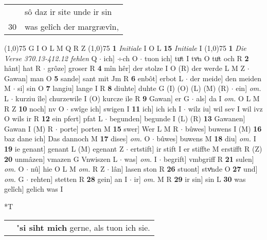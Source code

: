 \documentclass[8pt,a4paper,notitlepage]{article}
\begin{document}
\begin{table}[ht]
\begin{minipage}[t]{0.5\linewidth}
\begin{tabular}{rl}
 & sô daz ir site unde ir sin\\ 
30 & was gelîch der margrævîn,\\ 
\end{tabular}
\scriptsize
\line(1,0){75} \newline
G I O L M Q R Z \newline
\line(1,0){75} \newline
\textbf{1} \textit{Initiale} I O L  \textbf{15} \textit{Initiale} I  \newline
\line(1,0){75} \newline
\textbf{1} \textit{Die Verse 370.13-412.12 fehlen} Q   $\cdot$ ich] ÷ch O  $\cdot$ tuon ich] tuͤt I tvͦn O tuͦt och R \textbf{2} hânt] hat R  $\cdot$ grôze] groser R \textbf{4} mîn hêr] der stolze I O (R) der werde L M Z  $\cdot$ Gawan] man O \textbf{5} sande] sant mit Jm R \textbf{6} enbôt] erbot L  $\cdot$ der meide] den meiden M  $\cdot$ si] sin O \textbf{7} langiu] lange I R \textbf{8} diuhte] duhte G (I) (O) (L) (M) (R)  $\cdot$ ein] \textit{om.} L  $\cdot$ kurziu île] churzewile I (O) kurcze ile R \textbf{9} Gawan] er G  $\cdot$ als] da I \textit{om.} O L M R Z \textbf{10} noch] nv O  $\cdot$ swîge ich] swigen I \textbf{11} ich] ich ich I  $\cdot$ wilz iu] wil sev I wil ivz O wils ir R \textbf{12} ein pfert] pfat L  $\cdot$ begunden] begunde I (L) (R) \textbf{13} Gawanen] Gawan I (M) R  $\cdot$ porte] porten M \textbf{15} swer] Wer L M R  $\cdot$ bûwes] buwens I (M) \textbf{16} baz dane ich] Das dannoch M \textbf{17} dises] \textit{om.} O  $\cdot$ bûwes] buwens M \textbf{18} diu] \textit{om.} I \textbf{19} ie genant] genant L (M) egenant Z  $\cdot$ ertstift] ir stift I er stiffte M erstifft R (Z) \textbf{20} unmâzen] vmazen G Vnwiszen L  $\cdot$ was] \textit{om.} I  $\cdot$ begrift] vmbgriff R \textbf{21} sulen] \textit{om.} O  $\cdot$ nû] hie O L M \textit{om.} R Z  $\cdot$ lân] lasen ston R \textbf{26} stuont] stvͦnde O \textbf{27} und] \textit{om.} G  $\cdot$ rehten] stetten R \textbf{28} gein] an I  $\cdot$ ir] \textit{om.} M R \textbf{29} ir sin] sin L \textbf{30} was gelîch] gelich was I \newline
\end{minipage}
\hspace{0.5cm}
\begin{minipage}[t]{0.5\linewidth}
\small
\begin{center}*T
\end{center}
\begin{tabular}{rl}
 & "\textbf{si siht mich} gerne, als tuon ich sie.\\ 

\end{tabular}
\end{minipage}
\end{table}
\end{document}
